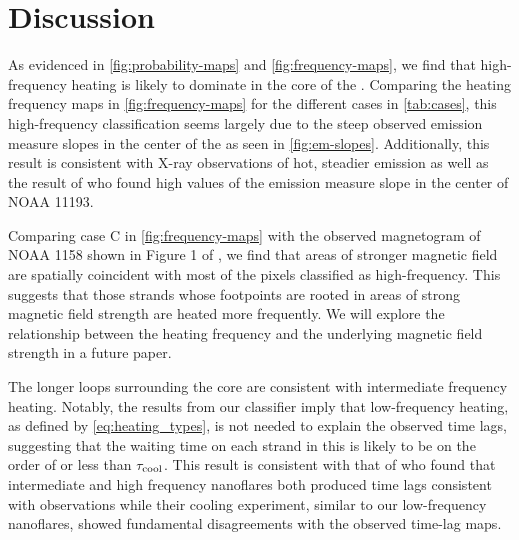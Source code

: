 \section{Discussion}\label{sec:discussion}

As evidenced in \autoref{fig:probability-maps} and \autoref{fig:frequency-maps}, we find that high-frequency heating is likely to dominate in the core of the \AR. 
Comparing the heating frequency maps in \autoref{fig:frequency-maps} for the different cases in \autoref{tab:cases}, this high-frequency classification seems largely due to the steep observed emission measure slopes in the center of the \AR{} as seen in \autoref{fig:em-slopes}.
Additionally, this result is consistent with X-ray observations of hot, steadier emission \citep{warren_evidence_2010,warren_constraints_2011,winebarger_using_2011} as well as the result of \citet{del_zanna_evolution_2015} who found high values of the emission measure slope in the center of NOAA 11193.

Comparing case C in \autoref{fig:frequency-maps} with the observed magnetogram of NOAA 1158 shown in Figure 1 of , we find that areas of stronger magnetic field are spatially coincident with most of the pixels classified as high-frequency.
This suggests that those strands whose footpoints are rooted in areas of strong magnetic field strength are heated more frequently.
We will explore the relationship between the heating frequency and the underlying magnetic field strength in a future paper.

The longer loops surrounding the core are consistent with intermediate frequency heating.
Notably, the results from our classifier imply that low-frequency heating, as defined by \autoref{eq:heating_types}, is not needed to explain the observed time lags, suggesting that the waiting time on each strand in this \AR{} is likely to be on the order of or less than $\tau_\textup{cool}$.
This result is consistent with that of \citet{bradshaw_patterns_2016} who found that intermediate and high frequency nanoflares both produced time lags consistent with observations while their cooling experiment, similar to our low-frequency nanoflares, showed fundamental disagreements with the observed time-lag maps.

